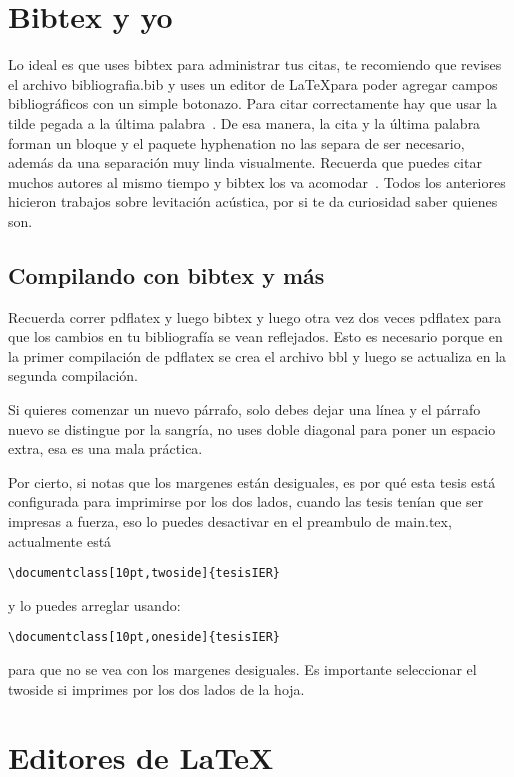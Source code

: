 \section{Bibtex y yo}


Lo ideal es que uses bibtex para administrar tus citas, te recomiendo que revises el archivo bibliografia.bib y uses un editor de \LaTeX para poder agregar campos bibliográficos con un simple botonazo. Para citar correctamente hay que usar la tilde pegada a la última palabra~\cite{he97}. De esa manera, la cita y la última palabra forman un bloque y el paquete hyphenation no las separa de ser necesario, además da una separación muy linda visualmente.  Recuerda que puedes citar muchos autores al mismo tiempo y bibtex los va acomodar~\cite{ansumali00,buick98,buick98a,guo00}. Todos los anteriores hicieron trabajos sobre levitación acústica, por si te da curiosidad saber quienes son.



\subsection{Compilando con bibtex y más}

Recuerda correr pdflatex y luego bibtex y luego otra vez dos veces pdflatex para que los cambios en tu bibliografía se vean reflejados.  Esto es necesario porque en la primer compilación de pdflatex se crea el archivo bbl y luego se actualiza en la segunda compilación.

Si quieres comenzar un nuevo párrafo,  solo debes dejar una línea y el párrafo nuevo se distingue por la sangría, no uses doble diagonal para poner un espacio extra, esa es una mala práctica.



Por cierto, si notas que los margenes están desiguales, es por qué esta tesis está configurada para imprimirse por los dos lados, cuando las tesis tenían que ser impresas a fuerza, eso lo puedes desactivar en el preambulo de main.tex, actualmente está
\begin{verbatim}
\documentclass[10pt,twoside]{tesisIER}
\end{verbatim}
y lo puedes arreglar usando:
\begin{verbatim}
\documentclass[10pt,oneside]{tesisIER}
\end{verbatim}
para que no se vea con los margenes desiguales. Es importante seleccionar el twoside si imprimes por los dos lados de la hoja. 

\section{Editores de \LaTeX}
